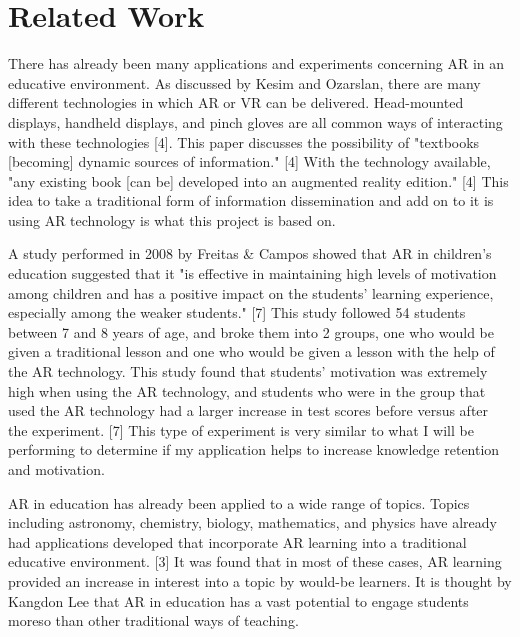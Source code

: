 \documentclass{vgtc}                          %
\begin{document}
\section{Related Work}

There has already been many applications and experiments concerning AR in an educative environment.  As discussed by Kesim and Ozarslan, there are many different technologies in which AR or VR can be delivered. Head-mounted displays, handheld displays, and pinch gloves are all common ways of interacting with these technologies [4]. This paper discusses the possibility of "textbooks [becoming] dynamic sources of information." [4] With the technology available, "any existing book [can be] developed into an augmented reality edition." [4] This idea to take a traditional form of information dissemination and add on to it is using AR technology is what this project is based on. 
\vspace*{4mm}

	A study performed in 2008 by Freitas & Campos showed that AR in children's education suggested that it "is effective in maintaining high levels of motivation among children and has a positive impact on the students' learning experience, especially among the weaker students." [7] This study followed 54 students between 7 and 8 years of age, and broke them into 2 groups, one who would be given a traditional lesson and one who would be given a lesson with the help of the AR technology. This study found that students' motivation was extremely high when using the AR technology, and students who were in the group that used the AR technology had a larger increase in test scores before versus after the experiment. [7] This type of experiment is very similar to what I will be performing to determine if my application helps to increase knowledge retention and motivation.
\vspace*{4mm}

	AR in education has already been applied to a wide range of topics. Topics including astronomy, chemistry, biology, mathematics, and physics have already had applications developed that incorporate AR learning into a traditional educative environment. [3] It was found that in most of these cases, AR learning provided an increase in interest into a topic by would-be learners. It is thought by Kangdon Lee that AR in education has a vast potential to engage students moreso than other traditional ways of teaching. 
\vspace*{4mm}
\end{document}
